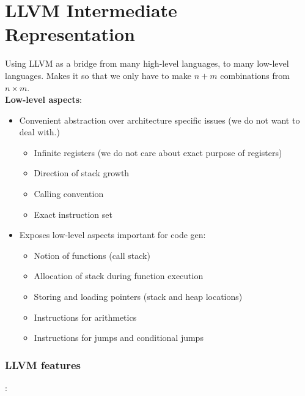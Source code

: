 \section{LLVM Intermediate Representation}

Using LLVM as a bridge from many high-level languages, to many low-level languages. Makes it so that we only have to make $n+m$ combinations from $n\times m$.\\

\textbf{Low-level aspects}:

\begin{itemize}
    \item Convenient abstraction over architecture specific issues (we do not want to deal with.)
    \begin{itemize}
        \item Infinite registers (we do not care about exact purpose of registers)
        \item Direction of stack growth
        \item Calling convention
        \item Exact instruction set
    \end{itemize}
    \item Exposes low-level aspects important for code gen:
    \begin{itemize}
        \item Notion of functions (call stack)
        \item Allocation of stack during function execution
        \item Storing and loading pointers (stack and heap locations)
        \item Instructions for arithmetics
        \item Instructions for jumps and conditional jumps
    \end{itemize}
\end{itemize}

\subsubsection{LLVM features}:


